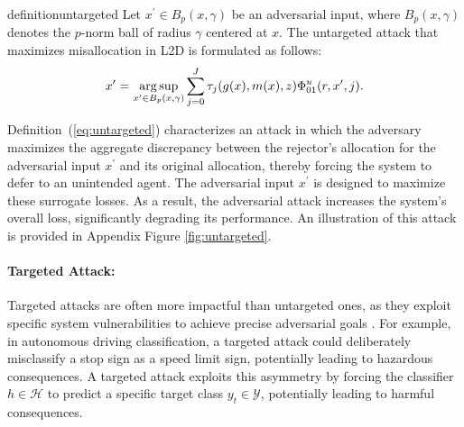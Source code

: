 \begin{restatable}{definition}{untargeted}\label{eq:untargeted}
Let \(x^\prime \in B_p(x, \gamma)\) be an adversarial input, where \(B_p(x, \gamma)\) denotes the \(p\)-norm ball of radius \(\gamma\) centered at \(x\). The untargeted attack that maximizes misallocation in L2D is formulated as follows:
\begin{equation*} 
    x^\prime = \operatorname*{arg\,sup}_{x^\prime \in B_p(x,\gamma)} \sum^J_{j=0} \tau_j(g(x),m(x),z) \Phi_{01}^u(r, x^\prime, j).
\end{equation*}
\end{restatable}

Definition~(\ref{eq:untargeted}) characterizes an attack in which the adversary maximizes the aggregate discrepancy between the rejector's allocation for the adversarial input \( x^\prime \) and its original allocation, thereby forcing the system to defer to an unintended agent. The adversarial input \( x^\prime \) is designed to maximize these surrogate losses. As a result, the adversarial attack increases the system's overall loss, significantly degrading its performance.  An illustration of this attack is provided in Appendix Figure \ref{fig:untargeted}.






\paragraph{Targeted Attack:} 
Targeted attacks are often more impactful than untargeted ones, as they exploit specific system vulnerabilities to achieve precise adversarial goals \citep{akhtar2018threat, chakraborty2021survey}. For example, in autonomous driving classification, a targeted attack could deliberately misclassify a stop sign as a speed limit sign, potentially leading to hazardous consequences. A targeted attack exploits this asymmetry by forcing the classifier \( h \in \mathcal{H} \) to predict a specific target class \( y_t \in \mathcal{Y} \), potentially leading to harmful consequences.


